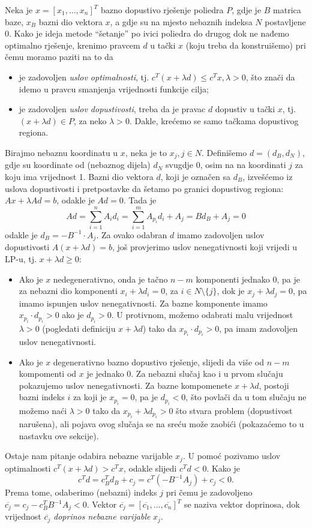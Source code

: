 \documentclass[a4paper, utf8, 11pt, colorlinks]{book}
\begin{document}
 Neka je $x = [x_1,\ldots, x_n]^T$ bazno dopustivo rješenje poliedra $P$, gdje je $B$ matrica baze, $x_B$ bazni dio vektora $x$, a gdje su na mjesto nebaznih indeksa $N$ postavljene 0.  Kako je ideja metode ``šetanje'' po ivici poliedra  do drugog dok ne nađemo optimalno rješenje, krenimo pravcem $d$ u  tački $x$ (koju  treba da konstruišemo) pri čemu moramo paziti na to da
\begin{itemize}
    \item je zadovoljen \emph{uslov optimalnosti}, tj. $c^T (x + \lambda d) \leq c^T x, \lambda>0$, što znači da idemo u pravcu smanjenja vrijednosti funkcije cilja;
    \item je zadovoljen \emph{uslov dopustivosti}, treba da je pravac $d$ dopustiv u tački $x$, tj. $ (x + \lambda d) \in P$, za neko $\lambda>0$. Dakle, krećemo se samo tačkama dopustivog regiona. 
\end{itemize}
Birajmo nebaznu koordinatu u $x$, neka je to $x_j, j \in N$. Definišemo $d=(d_B,  d_N)$, gdje su koordinate od (nebaznog dijela) $d_N$ svugdje 0, osim na na koordinati $j$ za koju ima vrijednost 1.   Bazni dio vektora $d$, koji je označen sa $d_B$, izvešćemo iz uslova dopustivosti i pretpostavke da šetamo po granici dopustivog regiona: $Ax + \lambda Ad = b$, odakle je $Ad = 0$. Tada je 
$$ Ad = \sum_{i=1}^n A_i d_i = \sum_{i=1}^m A_{p_i} d_i + A_j = B d_B + A_j = 0$$
odakle je $d_B = -  B^{-1} \cdot A_j $.  Za ovako odabran $d$ imamo zadovoljen uslov dopustivosti $A( x + \lambda d )  =b$, još provjerimo uslov nenegativnosti koji vrijedi u LP-u, tj. $x + \lambda d \geq 0$:
\begin{itemize}
    \item Ako je $x$ nedegenerativno, onda je tačno $n-m$ komponenti jednako 0,       pa je za nebazni dio komponenti $x_i + \lambda d_i = 0$, za $i \in N \setminus \{j\}$, dok je $x_j + \lambda d_j = 0$, pa imamo ispunjen uslov nenegativnosti. Za bazne komponente imamo $x_{p_i} \cdot d_{p_i} > 0 $ ako je $d_{p_i}>0$. U protivnom, možemo odabrati  malu vrijednost  $\lambda>0$ (pogledati definiciju $x +\lambda d$) tako da $x_{p_i} \cdot d_{p_i} >0$, pa imam zadovoljen uslov nenegativnosti.
    \item Ako je $x$ degenerativno bazno dopustivo rješenje, slijedi da više od $n-m$ kompomenti od $x$ je jednako 0. Za nebazni slučaj kao i u prvom slučaju pokazujemo uslov nenegativnosti. Za bazne kompomenete $x +\lambda d$,  postoji bazni indeks $i$ za koji je $x_{p_i} = 0$, pa   je $d_{p_i}< 0$, što povlači da u tom slučaju ne možemo naći $\lambda>0$ tako da $x_{p_i} + \lambda d_{p_i} >0$  što stvara problem (dopustivost narušena), ali pojava ovog slučaja se na sreću može zaobići (pokazaćemo to u nastavku ove sekcije). 
\end{itemize}
 Ostaje nam pitanje odabira nebazne varijable $x_j$. U pomoć pozivamo uslov optimalnosti $c^T ( x + \lambda d ) > c^T x $, odakle slijedi $c^T d < 0$.  Kako je $$c^T d = c_B^T d_B + c_j = c^T ( - B^{-1} A_j ) + c_j < 0.$$
 Prema tome, odaberimo (nebazni) indeks $j$ pri čemu je zadovoljeno $ \overline{c_j} = c_j - c_B^T B^{-1}A_j < 0$. Vektor $\overline{c_j}=[\overline{c_1}, \ldots, \overline{c_n}]^T$ se naziva vektor doprinosa, dok vrijednost $\overline{c_j}$ \emph{doprinos nebazne varijable} $x_j$. 
 
\end{document}
